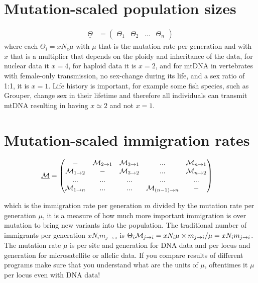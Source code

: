 \section*{Mutation-scaled population sizes}
\vskip -1cm 
\begin{align}
\underline{\Theta} &= \left( \begin{matrix} \Theta_1 & \Theta_2 & ... & \Theta_n \end{matrix} \right)
\end{align}
where each $\Theta_i = x N_e \mu$ with $\mu$ that is the mutation rate per generation and with $x$ that is a multiplier that depends on the ploidy and inheritance of the data, for nuclear data it $x=4$, for haploid data it is $x=2$, and for mtDNA in vertebrates with female-only transmission, no sex-change during its life, and a sex ratio of 1:1, it is $x=1$. Life history is important, for example some fish species, such as Grouper, change sex in their lifetime and therefore all individuals can transmit mtDNA resulting in having $x\simeq2$ and not $x=1$. 

\section*{Mutation-scaled immigration rates}
\vskip -1cm 
\begin{align}
\underline{\mathcal{M}} &= \left( \begin{matrix} - & \mathcal{M}_{2 \rightarrow 1} & \mathcal{M}_{3 \rightarrow 1} & ... & \mathcal{M}_{n \rightarrow 1} \\  \mathcal{M}_{1 \rightarrow 2} & - & \mathcal{M}_{3 \rightarrow 2} & ... & \mathcal{M}_{n \rightarrow 2}\\ 
... & ... & ... & ... & ... \\
\mathcal{M}_{1 \rightarrow n}  & ... & ... & \mathcal{M}_{(n-1) \rightarrow n}  & - \end{matrix} \right)
\end{align}

which is the immigration rate per generation $m$ divided by the mutation rate per generation $\mu$, it is a measure of how much more important immigration is over mutation to bring new variants into the population. The traditional number of immigrants per generation $xN_im_{j\rightarrow i}$ is  $\Theta_i\mathcal{M}_{j\rightarrow i} = xN_{i}\mu \times m_{j\rightarrow i} / \mu = xN_im_{j\rightarrow i}$. The mutation rate $\mu$ is per site and generation for DNA data and per locus and generation for microsatellite or allelic data. If you compare results of different programs make sure that you understand what are the units of $\mu$, oftentimes it $\mu$ per locus even with DNA data!


